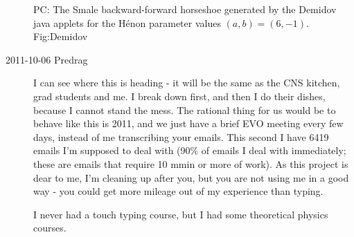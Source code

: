 \begin{description}
{}{
PC: The Smale backward-forward horseshoe generated by the
Demidov java applets for the H\'enon parameter values
$(a,b) = (6,-1)$.
    }{Fig:Demidov}


\item[2011-10-06 Predrag]
I can see where this is heading - it will be the same as the CNS kitchen,
grad students and me. I break down first, and then I do their dishes,
because I cannot stand the mess. The rational thing for us would be to
behave like this is 2011, and we just have a brief EVO meeting every few
days, instead of me transcribing your emails. This second I have 6419
emails I'm supposed to deal with (90\% of emails I deal with immediately;
these are emails that require 10 mmin or more of work). As this project
is dear to me, I'm cleaning up after you, but you are not using me in a
good way - you could get more mileage out of my experience than typing.

I never had a touch typing course, but I had some theoretical physics
courses.



\end{description}
